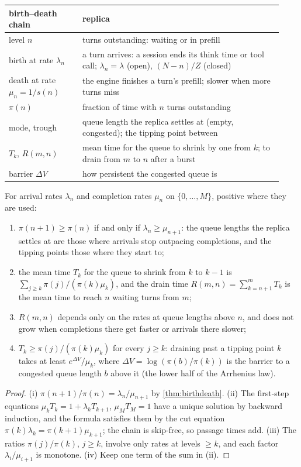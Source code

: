 \begin{center}\small
\begin{tabular}{@{}p{0.25\linewidth}p{0.68\linewidth}@{}}\toprule
birth--death chain & replica \\\midrule
level $n$ & turns outstanding: waiting or in prefill \\
birth at rate $\lambda_n$ & a turn arrives: a session ends its think time or tool call;
  $\lambda_n=\lambda$ (open), $(N-n)/Z$ (closed) \\
death at rate $\mu_n=1/s(n)$ & the engine finishes a turn's prefill; slower when more
  turns miss \\
$\pi(n)$ & fraction of time with $n$ turns outstanding \\
mode, trough & queue length the replica settles at (empty, congested); the tipping point
  between \\
$T_k$, $R(m,n)$ & mean time for the queue to shrink by one from $k$; to drain from $m$ to
  $n$ after a burst \\
barrier $\Delta V$ & how persistent the congested queue is \\\bottomrule
\end{tabular}
\end{center}

\begin{lemma}\label{L7:lem:bd}
For arrival rates $\lambda_n$ and completion rates $\mu_n$ on $\{0,\dots,M\}$, positive
where they are used:
\begin{enumerate}[label=(\roman*)]
\item $\pi(n+1)\ge\pi(n)$ if and only if $\lambda_n\ge\mu_{n+1}$: the queue lengths the
  replica settles at are those where arrivals stop outpacing completions, and the tipping
  points those where they start to;
\item the mean time $T_k$ for the queue to shrink from $k$ to $k-1$ is
  $\sum_{j\ge k}\pi(j)/(\pi(k)\mu_k)$, and the drain time $R(m,n)=\sum_{k=n+1}^mT_k$ is the
  mean time to reach $n$ waiting turns from $m$;
\item $R(m,n)$ depends only on the rates at queue lengths above $n$, and does not grow
  when completions there get faster or arrivals there slower;
\item $T_k\ge\pi(j)/(\pi(k)\mu_k)$ for every $j\ge k$: draining past a tipping point $k$
  takes at least $e^{\Delta V}/\mu_k$, where $\Delta V=\log(\pi(b)/\pi(k))$ is the barrier
  to a congested queue length $b$ above it (the lower half of the Arrhenius law).
\end{enumerate}
\end{lemma}
\begin{proof}
(i) $\pi(n+1)/\pi(n)=\lambda_n/\mu_{n+1}$ by \cref{thm:birthdeath}. (ii) The first-step
equations $\mu_kT_k=1+\lambda_kT_{k+1}$, $\mu_MT_M=1$ have a unique solution by backward
induction, and the formula satisfies them by the cut equation
$\pi(k)\lambda_k=\pi(k+1)\mu_{k+1}$; the chain is skip-free, so passage times add.
(iii) The ratios $\pi(j)/\pi(k)$, $j\ge k$, involve only rates at levels $\ge k$, and
each factor $\lambda_i/\mu_{i+1}$ is monotone. (iv) Keep one term of the sum in (ii).
\end{proof}

